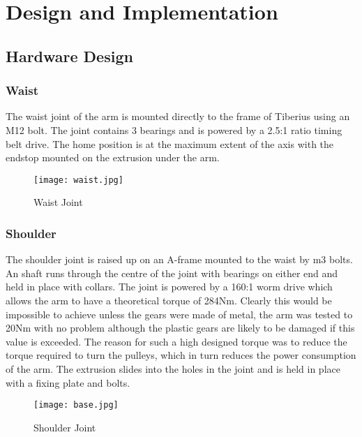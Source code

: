 \section{Design and Implementation}

\subsection{Hardware Design}


\subsubsection{Waist}
The waist joint of the arm is mounted directly to the frame of Tiberius using an M12 bolt. The joint contains 3 bearings and is powered by a 2.5:1 ratio timing belt drive. The home position is at the maximum extent of the axis with the endstop mounted on the extrusion under the arm.

\begin{figure}[!htb]
\begin{center}
\texttt{[image: waist.jpg]}
\end{center}
\caption{Waist Joint}
\label{fig:waist}
\end{figure}

\subsubsection{Shoulder}
The shoulder joint is raised up on an A-frame mounted to the waist by m3 bolts. An shaft runs through the centre of the joint with bearings on either end and held in place with collars. The joint is powered by a 160:1 worm drive which allows the arm to have a theoretical torque of 284Nm. Clearly this would be impossible to achieve unless the gears were made of metal, the arm was tested to 20Nm with no problem although the plastic gears are likely to be damaged if this value is exceeded. The reason for such a high designed torque was to reduce the torque required to turn the pulleys, which in turn reduces the power consumption of the arm. The extrusion slides into the holes in the joint and is held in place with a fixing plate and bolts. 

\begin{figure}[!htb]
\begin{center}
\texttt{[image: base.jpg]}
\end{center}
\caption{Shoulder Joint}
\label{fig:shoulder}
\end{figure}

